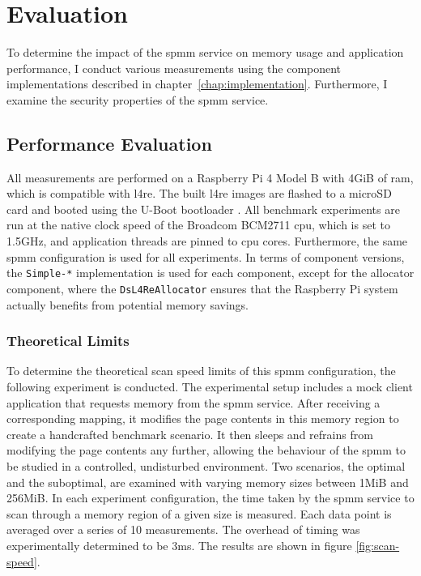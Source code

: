 \chapter{Evaluation}
\label{chap:evaluation}

To determine the impact of the \ac{spmm} service on memory usage and application performance, I conduct various measurements using the component implementations described in chapter~\ref{chap:implementation}.
Furthermore, I examine the security properties of the \ac{spmm} service.

\section{Performance Evaluation}
\label{sec:performance-evaluation}

All measurements are performed on a Raspberry Pi 4 Model B with 4GiB of \acs{ram}, which is compatible with \ac{l4re}.
The built \ac{l4re} images are flashed to a microSD card and booted using the U-Boot bootloader \cite{u-boot}.
All benchmark experiments are run at the native clock speed of the Broadcom BCM2711 \acs{cpu}, which is set to 1.5GHz, and application threads are pinned to \acs{cpu} cores.
Furthermore, the same \ac{spmm} configuration is used for all experiments.
In terms of component versions, the \texttt{Simple-*} implementation is used for each component, except for the allocator component, where the \texttt{Ds\-L4Re\-Allocator} ensures that the Raspberry Pi system actually benefits from potential memory savings.

\subsection{Theoretical Limits}
\label{subsec:theoretical-limits}

To determine the theoretical scan speed limits of this \ac{spmm} configuration, the following experiment is conducted.
The experimental setup includes a mock client application that requests memory from the \ac{spmm} service.
After receiving a corresponding mapping, it modifies the page contents in this memory region to create a handcrafted benchmark scenario.
It then sleeps and refrains from modifying the page contents any further, allowing the behaviour of the \ac{spmm} to be studied in a controlled, undisturbed environment.
Two scenarios, the optimal and the suboptimal, are examined with varying memory sizes between 1MiB and 256MiB.
In each experiment configuration, the time taken by the \ac{spmm} service to scan through a memory region of a given size is measured.
Each data point is averaged over a series of 10 measurements.
The overhead of timing was experimentally determined to be 3ms.
The results are shown in figure \ref{fig:scan-speed}.

